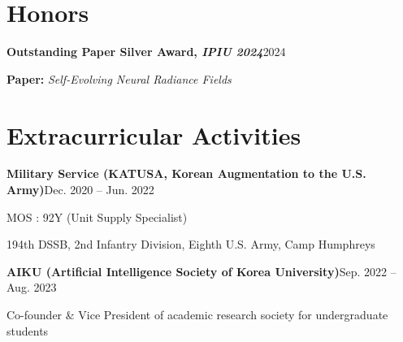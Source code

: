 \documentclass[11pt,letterpaper]{article}
\makeatletter
\newcommand{\cv@line}[2]{{\parfillskip=0pt\relax\noindent#1\hfill#2\null\par}}
\newcommand{\cventry}[4]{%
  \cv@line{\textbf{#1}}{#2}%
  \def\cv@second{#3}%
  \ifx\cv@second\@empty\else
    \vspace{-7pt}%
    \cv@line{#3}{#4}%
  \fi
  \vspace{-5pt}%
}
\newcommand{\largesection}[1]{\vspace{1pt} \section{\LARGE#1} \vspace{1pt}}
\makeatother
\begin{document}

\vspace{5pt}
\largesection{Honors}

\cventry{Outstanding Paper Silver Award, \textit{IPIU 2024}}{2024}{}{}
\begin{cvbullets}
  \item \textbf{Paper:} \textit{Self-Evolving Neural Radiance Fields}
\end{cvbullets}


\largesection{Extracurricular Activities}

\cventry{Military Service (KATUSA, Korean Augmentation to the U.S. Army)}{Dec. 2020 -- Jun. 2022}{}{}
\begin{cvbullets}
  \item MOS : 92Y (Unit Supply Specialist)
  \item 194th DSSB, 2nd Infantry Division, Eighth U.S. Army, Camp Humphreys
\end{cvbullets}

\cventry{AIKU (Artificial Intelligence Society of Korea University)}{Sep. 2022 -- Aug. 2023}
        {}{}
\begin{cvbullets}
  \item Co-founder \& Vice President of academic research society for undergraduate students
\end{cvbullets}
\end{document}
